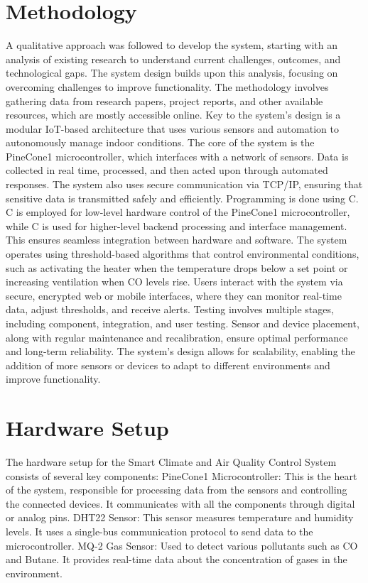 \documentclass[USenglish,oneside,twocolumn]{article}
\begin{document}
\section{Methodology}
A qualitative approach was followed to develop the system, starting with an analysis of existing research to understand current challenges, outcomes, and technological gaps. The system design builds upon this analysis, focusing on overcoming challenges to improve functionality. The methodology involves gathering data from research papers, project reports, and other available resources, which are mostly accessible online. Key to the system's design is a modular IoT-based architecture that uses various sensors and automation to autonomously manage indoor conditions. The core of the system is the PineCone1 microcontroller, which interfaces with a network of sensors. Data is collected in real time, processed, and then acted upon through automated responses. The system also uses secure communication via TCP/IP, ensuring that sensitive data is transmitted safely and efficiently. Programming is done using C. C is employed for low-level hardware control of the PineCone1 microcontroller, while C is used for higher-level backend processing and interface management. This ensures seamless integration between hardware and software. The system operates using threshold-based algorithms that control environmental conditions, such as activating the heater when the temperature drops below a set point or increasing ventilation when CO levels rise. Users interact with the system via secure, encrypted web or mobile interfaces, where they can monitor real-time data, adjust thresholds, and receive alerts. Testing involves multiple stages, including component, integration, and user testing. Sensor and device placement, along with regular maintenance and recalibration, ensure optimal performance and long-term reliability. The system's design allows for scalability, enabling the addition of more sensors or devices to adapt to different environments and improve functionality.

\section{Hardware Setup}
The hardware setup for the Smart Climate and Air Quality Control System consists of several key components: PineCone1 Microcontroller: This is the heart of the system, responsible for processing data from the sensors and controlling the connected devices. It communicates with all the components through digital or analog pins. DHT22 Sensor: This sensor measures temperature and humidity levels. It uses a single-bus communication protocol to send data to the microcontroller.\cite{dutta_2016_airsense} MQ-2 Gas Sensor: Used to detect various pollutants such as CO and Butane. It provides real-time data about the concentration of gases in the environment.\cite{adhiwibowo_2020_temperature}
\end{document}
